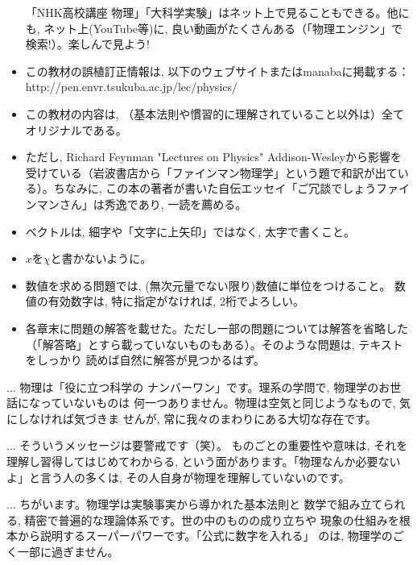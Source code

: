 \begin{itemize}
\begin{itemize}
\end{itemize}
「NHK高校講座 物理」「大科学実験」はネット上で見ることもできる。他にも, ネット上(YouTube等)に, 良い動画がたくさんある（「物理エンジン」で検索!）。楽しんで見よう!
\item この教材の誤植訂正情報は, 以下のウェブサイトまたはmanabaに掲載する：\\
http://pen.envr.tsukuba.ac.jp/lec/physics/
\item この教材の内容は, （基本法則や慣習的に理解されていること以外は）全てオリジナルである。
\item ただし, Richard Feynman "Lectures on Physics" Addison-Wesleyから影響を
受けている（岩波書店から「ファインマン物理学」という題で和訳が出ている）。ちなみに, 
この本の著者が書いた自伝エッセイ「ご冗談でしょうファインマンさん」は秀逸であり, 一読を薦める。
\item ベクトルは, 細字や「文字に上矢印」ではなく, 太字で書くこと。
\item $x$を$\chi$と書かないように。
\item 数値を求める問題では, (無次元量でない限り)数値に単位をつけること。
数値の有効数字は, 特に指定がなければ, 2桁でよろしい。
\item 各章末に問題の解答を載せた。ただし一部の問題については解答を省略した
（「解答略」とすら載っていないものもある）。そのような問題は, テキストをしっかり
読めば自然に解答が見つかるはず。
\end{itemize}
\mv

\begin{faq}{\small{} ... 物理は「役に立つ科学の
ナンバーワン」です。理系の学問で, 物理学のお世話になっていないものは
何一つありません。物理は空気と同じようなもので, 気にしなければ気づきま
せんが, 常に我々のまわりにある大切な存在です。}\end{faq}

\begin{faq}{\small{} ... そういうメッセージは要警戒です（笑）。
ものごとの重要性や意味は, それを理解し習得してはじめてわからる, 
という面があります。「物理なんか必要ないよ」と言う人の多くは, 
その人自身が物理を理解していないのです。}\end{faq}

\begin{faq}{\small{} ... ちがいます。物理学は実験事実から導かれた基本法則と
数学で組み立てられる, 精密で普遍的な理論体系です。世の中のものの成り立ちや
現象の仕組みを根本から説明するスーパーパワーです。「公式に数字を入れる」
のは, 物理学のごく一部に過ぎません。}\end{faq}

